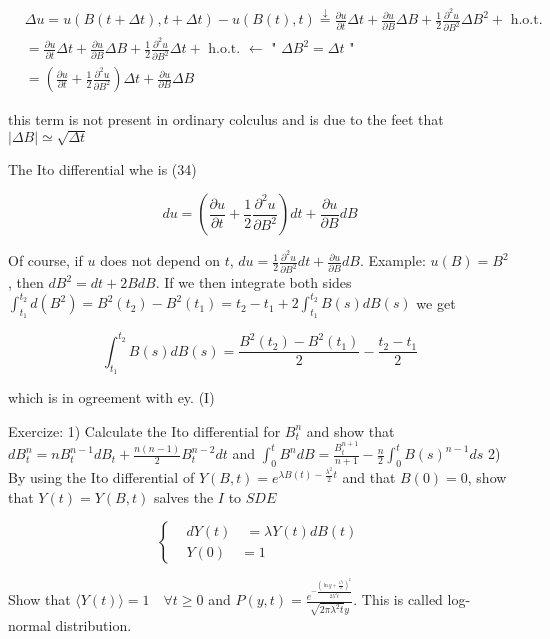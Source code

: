 $$
 \begin{aligned}
& \Delta u=u(B(t+\Delta t), t+\Delta t)-u(B(t), t) \stackrel{\downarrow}{=} \frac{\partial u}{\partial t} \Delta t+\frac{\partial u}{\partial B} \Delta B+\frac{1}{2} \frac{\partial^{2} u}{\partial B^{2}} \Delta B^{2}+\text{ h.o.t. } \\
& =\frac{\partial u}{\partial t} \Delta t+\frac{\partial u}{\partial B} \Delta B+\frac{1}{2} \frac{\partial^{2} u}{\partial B^{2}} \Delta t+\text{ h.o.t. } \leftarrow \text{ " } \Delta B^{2}=\Delta t \text{ " } \\
& =\left(\frac{\partial u}{\partial t}+\frac{1}{2} \frac{\partial^{2} u}{\partial B^{2}}\right) \Delta t+\frac{\partial u}{\partial B} \Delta B
\end{aligned}
$$ 

this term is not present in ordinary colculus and is due to the feet that $|
\Delta B| \simeq \sqrt{\Delta t}$

The Ito differential whe is
(34)

$$
 d u=\left(\frac{\partial u}{\partial t}+\frac{1}{2} \frac{\partial^{2} u}{\partial B^{2}}\right) d t+\frac{\partial u}{\partial B} d B
$$ 

Of course, if $u$ does not depend on $t$, $d u=\frac{1}{2} \frac{\partial^{2} u}{\partial B^{2}} d t+\frac{\partial u}{\partial B} d B$.
Example: $u(B)=B^{2}$, then $d B^{2}=d t+2 B d B$. If we then integrate both sides $\int_{t_{1}}^{t_{2}} d
\left(B^{2}\right)=B^{2}
\left(t_{2}\right)-B^{2}
\left(t_{1}\right)=t_{2}-t_{1}+2 \int_{t_{1}}^{t_{2}} B(s) d B(s)$ we get

$$
 \int_{t_{1}}^{t_{2}} B(s) d B(s)=\frac{B^{2}
\left(t_{2}\right)-B^{2}
\left(t_{1}\right)}{2}-\frac{t_{2}-t_{1}}{2}
$$ 

which is in ogreement with ey. (I)

Exercize: 1) Calculate the Ito differential for $B_{t}^{n}$ and show that $d B_{t}^{n}=n B_{t}^{n-1} d B_{t}+\frac{n(n-1)}{2} B_{t}^{n-2} d t$ and $\int_{0}^{t} B^{n} d B=\frac{B_{t}^{n+1}}{n+1}-\frac{n}{2} \int_{0}^{t} B(s)^{n-1} d s$
2) By using the Ito differential of $Y(B, t)=e^{\lambda B(t)-\frac{\lambda^{2}}{2} t}$ and that $B(0)=0$, show that $Y(t)=Y(B, t)$ salves the $I$ to $S D E$

$$
 \left\{
\begin{aligned}
& d Y(t) \quad=\lambda Y(t) d B(t) \\
& Y(0) \quad=1
\end{aligned}\right.
$$ 

Show that $\langle Y(t)\rangle=1 \quad \forall t \geqslant 0$ and $P(y, t)=\frac{e^{-\frac{\left(\ln y+\frac{\lambda^{2} t}{2}\right)^{2}}{2 \lambda^{2} t}}}{\sqrt{2 \pi \lambda^{2} t} y}$. This is called log-normal distribution.

